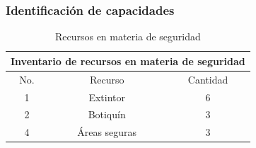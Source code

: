 % 
% 
% 
% 
% 
% 

% 
% 
\subsubsection{Identificación de capacidades}

\begin{table}[H]
    \centering
    \caption{Recursos en materia de seguridad}
    \begin{tabular}{c c c}
    \hline
    \multicolumn{3}{c}{Inventario de recursos en materia de seguridad}\\
    \hline
         No.& Recurso & Cantidad  \\
    \hline
         1& Extintor & 6  \\
    \hline
         2& Botiquín & 3  \\
    \hline
         4& Áreas seguras & 3 \\
    \hline     
    \end{tabular}
    \label{tab:inventario}
\end{table}
% 
% 
